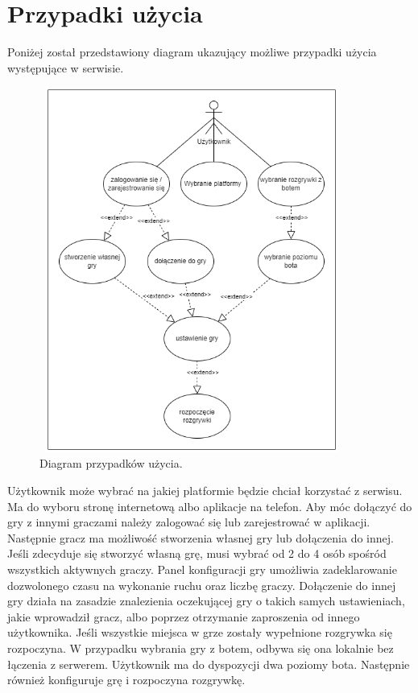 \section{Przypadki użycia}
Poniżej został przedstawiony diagram ukazujący możliwe przypadki użycia występujące w serwisie.

\begin{figure}[h!]
	\begin{center}
		\includegraphics[width=10cm,height=12cm]{img/przypadki-uzycia.png}
	\end{center}
	\caption{{\color{dgray} Diagram przypadków użycia.}} 
	\label{przypadki_uzycia}
\end{figure} 

Użytkownik może wybrać na jakiej platformie będzie chciał korzystać z serwisu. Ma do wyboru stronę internetową albo aplikacje na telefon. Aby móc dołączyć do gry z innymi graczami należy zalogować się lub zarejestrować w aplikacji. Następnie gracz ma możliwość stworzenia własnej gry lub dołączenia do innej. Jeśli zdecyduje się stworzyć własną grę, musi wybrać od 2 do 4 osób spośród wszystkich aktywnych graczy. Panel konfiguracji gry umożliwia zadeklarowanie dozwolonego czasu na wykonanie ruchu oraz liczbę graczy. Dołączenie do innej gry działa na zasadzie znalezienia oczekującej gry o takich samych ustawieniach, jakie wprowadził gracz, albo poprzez otrzymanie zaproszenia od innego użytkownika. Jeśli wszystkie miejsca w grze zostały wypełnione rozgrywka się rozpoczyna. W przypadku wybrania gry z botem, odbywa się ona lokalnie bez łączenia z serwerem. Użytkownik ma do dyspozycji dwa poziomy bota. Następnie również konfiguruje grę i rozpoczyna rozgrywkę. \\ \\ \\ \\

